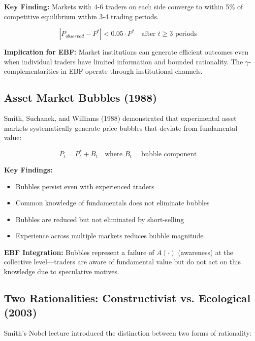 \textbf{Key Finding:} Markets with 4-6 traders on each side converge to within
5\% of competitive equilibrium within 3-4 trading periods.

\begin{equation}
|P_{observed} - P^*| < 0.05 \cdot P^* \quad \text{after } t \geq 3 \text{ periods}
\label{eq:vs-convergence}
\end{equation}

\textbf{Implication for EBF:} Market institutions can generate efficient outcomes
even when individual traders have limited information and bounded rationality.
The $\gamma$-complementarities in EBF operate through institutional channels.

\subsection{Asset Market Bubbles (1988)}

Smith, Suchanek, and Williams (1988) demonstrated that experimental asset
markets systematically generate price bubbles that deviate from fundamental
value:

\begin{equation}
P_t = P^*_t + B_t \quad \text{where } B_t = \text{bubble component}
\label{eq:vs-bubble}
\end{equation}

\textbf{Key Findings:}
\begin{itemize}
\item Bubbles persist even with experienced traders
\item Common knowledge of fundamentals does not eliminate bubbles
\item Bubbles are reduced but not eliminated by short-selling
\item Experience across multiple markets reduces bubble magnitude
\end{itemize}

\textbf{EBF Integration:} Bubbles represent a failure of $A(\cdot)$ (awareness)
at the collective level---traders are aware of fundamental value but do not
act on this knowledge due to speculative motives.

\subsection{Two Rationalities: Constructivist vs. Ecological (2003)}

Smith's Nobel lecture introduced the distinction between two forms of rationality:

